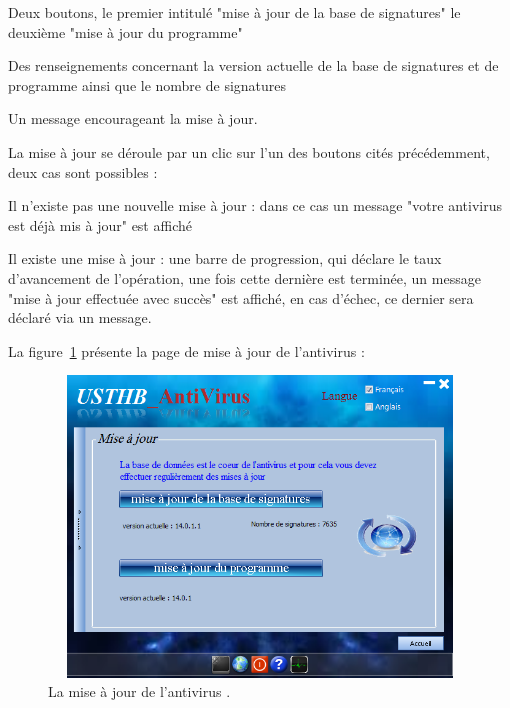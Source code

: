 \begin{list}{•}{}
\item Deux boutons, le premier intitulé "mise à jour de la base de signatures"  le deuxième "mise à jour du programme"
\item Des renseignements concernant la version actuelle de la base de signatures et de programme ainsi que le nombre de signatures
\item Un message encourageant la mise à jour.\\
\end{list}
La mise à jour se déroule par un clic sur l'un des boutons cités précédemment, deux cas sont possibles :\\
\begin{list}{•}{}
\item Il n'existe pas une nouvelle mise à jour : dans ce cas un message "votre antivirus est déjà mis à jour" est affiché
\item Il existe une mise à jour : une barre de progression, qui déclare le taux d'avancement de l'opération, une fois cette dernière est terminée, un message "mise à jour effectuée avec succès" est affiché, en cas d'échec, ce dernier sera déclaré via un message. \\
\end{list}
La figure~\ref{fig :ant5} présente la page de mise à jour de l'antivirus :
\begin{figure}[H]
\begin{center}
\includegraphics[width=13cm, height=8cm]{Figures/ant5.png}
\caption{La mise à jour de l'antivirus .}
\label{fig :ant5} 
\end{center}
\end{figure}
